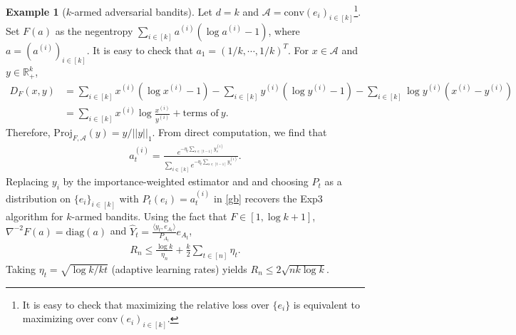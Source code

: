 \documentclass[10pt,a4article]{article}
\numberwithin{equation}{section}
\theoremstyle{plain}
\theoremstyle{definition}
\newtheorem{Ex}[Th]{Example}
\def\R{{\mathbb R}}
\def\R{{\mathbb R}}
\begin{document}
\begin{Ex}[$k$-armed adversarial bandits]\label{al:ex1}
Let $d=k$ and $\mathcal A = \text{conv}(e_i)_{i\in [k]}$\footnote{It is easy to check that maximizing the relative loss over $\{e_i\}$ is equivalent to maximizing over $\text{conv}(e_i)_{i\in [k]}$.}. Set $F(a)$ as the negentropy $\sum_{i\in [k]}a^{(i)}(\log a^{(i)}-1)$, where $a=(a^{(i)})_{i\in [k]}$. It is easy to check that $a_1=(1/k, \cdots, 1/k)^T$. For $x\in\mathcal A$ and $y\in\R_+^k$, 
\begin{align*}
D_F(x,y) &= \sum_{i\in [k]}x^{(i)}(\log x^{(i)}-1)-\sum_{i\in [k]}y^{(i)}(\log y^{(i)}-1)-\sum_{i\in [k]}\log y^{(i)}(x^{(i)}-y^{(i)})\\
& = \sum_{i\in [k]}x^{(i)}\log \frac{x^{(i)}}{y^{(i)}}+\text{terms of}\ y.
\end{align*}
Therefore, $\text{Proj}_{F, \mathcal A}(y) = y/||y||_1$. From direct computation, we find that
\begin{align}
a_t^{(i)} = \frac{e^{-\eta_t\sum_{s\in [t-1]} y_s^{(i)}}}{\sum_{i\in [k]}e^{-\eta_t\sum_{s\in [t-1]} y_s^{(i)}}}. \label{al:5}
\end{align}
Replacing $y_i$ by the importance-weighted estimator and and choosing $P_t$ as a distribution on $\{e_i\}_{i\in [k]}$ with $P_t(e_i)=a_t^{(i)}$ in \eqref{gb} recovers the Exp3 algorithm for $k$-armed bandits. 
Using the fact that $F\in [1,\log k+1] $, $\nabla^{-2} F(a) = \text{diag}(a)$ and $\hat{Y}_t=\frac{\langle y_t, e_{A_t}\rangle}{P_{A_t}}e_{A_t}$,
\begin{align*}
R_n\leq\frac{\log k}{\eta_n}+\frac{k}{2}\sum_{t\in [n]}\eta_t.
\end{align*}
Taking $\eta_t = \sqrt{\log k/kt}$ (adaptive learning rates) yields $R_n\leq 2\sqrt{nk\log k}$.
\end{Ex}
\end{document}
